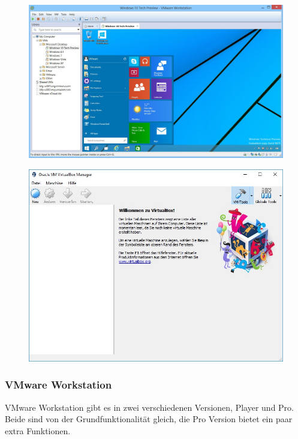 \begin{figure}[H]
	\begin{minipage}[b]{.5 \linewidth}
		\centering
		\includegraphics[width=0.8 \linewidth]{images/vmware}
		 \label{fig:1a}
	\end{minipage}
	\begin{minipage}[b]{.5 \linewidth}
		\centering
		\includegraphics[width=0.8 \linewidth]{images/virtualbox}
		 \label{fig:1b}
	\end{minipage}
\end{figure}

\subsubsection{VMware Workstation}
VMware Workstation gibt es in zwei verschiedenen Versionen, Player und Pro.
Beide sind von der Grundfunktionalität gleich, die Pro Version bietet ein paar extra Funktionen.  

